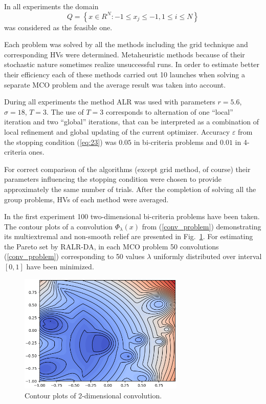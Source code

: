 \documentclass[runningheads]{llncs}
\begin{document}
In all experiments the domain
\[
Q = \left\{x \in R^N : -1 \leq x_j \leq -1, 1 \leq i \leq N \right\}
\]
was considered as the feasible one. 

Each problem was solved by all the methods including the grid technique and corresponding HVs were determined.  Metaheuristic methods because of their stochastic nature sometimes realize unsuccessful runs. In order to estimate better their efficiency each of these methods carried out 10 launches when solving a separate MCO problem and the average result was taken into account.

During all experiments the method ALR was used with parameters $r=5.6$, $\sigma = 18$, $T=3$. 
The use of $T=3$ corresponds to alternation of one ``local'' iteration and two ``global'' iterations, that can be interpreted as a combination of local refinement and global updating of the current optimizer.
Accuracy $\varepsilon$ from the stopping condition (\ref{eq:23}) was $0.05$ in bi-criteria problems and $0.01$ in 4-criteria ones.

For correct comparison of the algorithms (except grid method, of course) their parameters influencing the stopping condition were chosen to provide approximately the same number of trials. After the completion of solving all the group problems, HVs of each method were averaged.

In the first experiment 100 two-dimensional bi-criteria problems have been taken. The contour plots of a convolution $\Phi_\lambda(x)$ from (\ref{conv_problem})  demonstrating its multiextremal and non-smooth relief are presented in Fig.~\ref{fig1}. For estimating the Pareto set by RALR-DA, in each MCO problem 50 convolutions (\ref{conv_problem}) corresponding to 50 values $\lambda$ uniformly distributed over interval $[0,1]$ have been minimized.

\begin{figure}
\centering
\includegraphics[width=0.7\textwidth]{fig1.png} 
\caption{Contour plots of 2-dimensional convolution.}\label{fig1} 
\end{figure}
\end{document}

